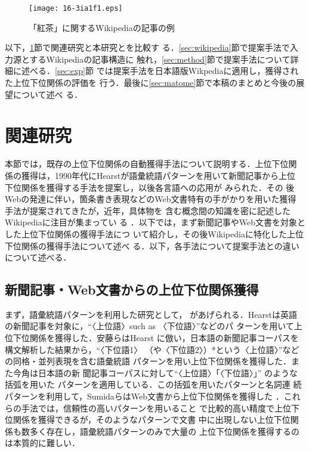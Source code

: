 \documentclass[japanese]{jnlp_1.4}
\begin{document}
\begin{figure}[t]
\begin{center}
\texttt{[image: 16-3ia1f1.eps]}
\end{center}
\caption{「紅茶」に関するWikipediaの記事の例}
\label{fig:wiki}
\end{figure}

以下，\ref{sec:bib}節で関連研究と本研究とを比較す
る．\ref{sec:wikipedia}節で提案手法で入力源とするWikipediaの記事構造に
触れ，\ref{sec:method}節で提案手法について詳細に述べる．\ref{sec:exp}節
では提案手法を日本語版Wikpediaに適用し，獲得された上位下位関係の評価を
行う．最後に\ref{sec:matome}節で本稿のまとめと今後の展望について述べ
る．


\section{関連研究}\label{sec:bib}

本節では，既存の上位下位関係の自動獲得手法について説明する．上位下位関
係の獲得は，1990年代にHearstが語彙統語パターンを用いて新聞記事から上位
下位関係を獲得する手法を提案し\cite{hearst_1992}，以後各言語への応用が
みられた\cite{JImasumi,JAndo,Pantel_2006,Sumida_2006,Oishi_06}．その
後Webの発達に伴い，箇条書き表現などのWeb文書特有の手がかりを用いた獲得
手法が提案されてきた\cite{Shinzato_2004,Etzioni_2005}が，近年，具体物を
含む概念間の知識を密に記述したWikipediaに注目が集まってい
る
\cite{Ruiz-Casado_2005,Pasca_2006,Herbelot_2006,Suchanek_2007,Kazama_2007}
．以下では，まず新聞記事やWeb文書を対象とした上位下位関係の獲得手法につ
いて紹介し，その後Wikipediaに特化した上位下位関係の獲得手法について述べ
る．以下，各手法について提案手法との違いについて述べる．


\subsection{新聞記事・Web文書からの上位下位関係獲得}

まず，語彙統語パターンを利用した研究として，
\cite{hearst_1992,JImasumi,JAndo,Sumida_2006}があげられる．Hearstは英語
の新聞記事を対象に，“〈上位語〉such as 〈下位語〉”などのパ
ターンを用いて上位下位関係を獲得した\cite{hearst_1992}．安藤らはHearst
に倣い，日本語の新聞記事コーパスを構文解析した結果から，“〈下位語1〉
（や〈下位語2〉）*という〈上位語〉”などの同格・並列表現を含む語彙統語
パターンを用い上位下位関係を獲得した\cite{JAndo}．また今角は日本語の新
聞記事コーパスに対して“〈上位語〉「〈下位語〉」” のような括弧を用いた
パターンを適用している\cite{JImasumi}．この括弧を用いたパターンと名詞連
続パターンを利用して，SumidaらはWeb文書から上位下位関係を獲得した
\cite{Sumida_2006}．これらの手法では，信頼性の高いパターンを用いること
で比較的高い精度で上位下位関係を獲得できるが，そのようなパターンで文書
中に出現しない上位下位関係も数多く存在し，語彙統語パターンのみで大量の
上位下位関係を獲得するのは本質的に難しい．
\end{document}
